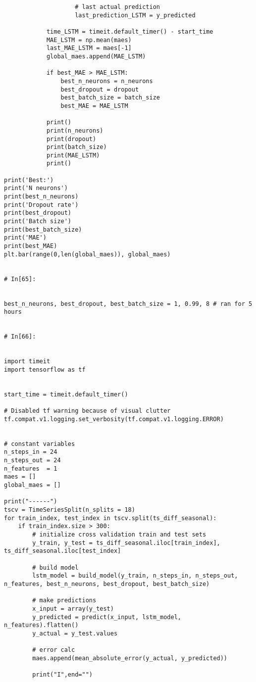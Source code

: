 \begin{verbatim}
                    # last actual prediction 
                    last_prediction_LSTM = y_predicted

            time_LSTM = timeit.default_timer() - start_time
            MAE_LSTM = np.mean(maes)
            last_MAE_LSTM = maes[-1]
            global_maes.append(MAE_LSTM)

            if best_MAE > MAE_LSTM:
                best_n_neurons = n_neurons
                best_dropout = dropout
                best_batch_size = batch_size
                best_MAE = MAE_LSTM

            print()
            print(n_neurons)
            print(dropout)
            print(batch_size)
            print(MAE_LSTM)
            print()    

print('Best:')
print('N neurons')
print(best_n_neurons)
print('Dropout rate')
print(best_dropout)
print('Batch size')
print(best_batch_size)
print('MAE')
print(best_MAE)
plt.bar(range(0,len(global_maes)), global_maes)


# In[65]:


best_n_neurons, best_dropout, best_batch_size = 1, 0.99, 8 # ran for 5 hours


# In[66]:


import timeit
import tensorflow as tf


start_time = timeit.default_timer()

# Disabled tf warning because of visual clutter
tf.compat.v1.logging.set_verbosity(tf.compat.v1.logging.ERROR)


# constant variables
n_steps_in = 24
n_steps_out = 24
n_features  = 1
maes = []
global_maes = []

print("------")
tscv = TimeSeriesSplit(n_splits = 18)
for train_index, test_index in tscv.split(ts_diff_seasonal): 
    if train_index.size > 300:  
        # initialize cross validation train and test sets
        y_train, y_test = ts_diff_seasonal.iloc[train_index], ts_diff_seasonal.iloc[test_index]

        # build model
        lstm_model = build_model(y_train, n_steps_in, n_steps_out, n_features, best_n_neurons, best_dropout, best_batch_size)

        # make predictions
        x_input = array(y_test)
        y_predicted = predict(x_input, lstm_model, n_features).flatten()
        y_actual = y_test.values

        # error calc
        maes.append(mean_absolute_error(y_actual, y_predicted))

        print("I",end="")


\end{verbatim}
